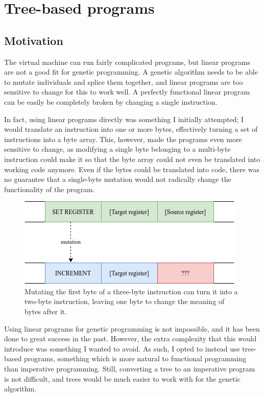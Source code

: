 \documentclass{report}
\begin{document}
\section{Tree-based programs}
\subsection{Motivation}
The virtual machine can run fairly complicated programs, but linear programs are not a good fit for genetic programming. A genetic algorithm needs to be able to mutate individuals and splice them together, and linear programs are too sensitive to change for this to work well. A perfectly functional linear program can be easily be completely broken by changing a single instruction.

In fact, using linear programs directly was something I initially attempted; I would translate an instruction into one or more bytes, effectively turning a set of instructions into a byte array. This, however, made the programs even more sensitive to change, as modifying a single byte belonging to a multi-byte instruction could make it so that the byte array could not even be translated into working code anymore. Even if the bytes could be translated into code, there was no guarantee that a single-byte mutation would not radically change the functionality of the program.

\begin{figure}[ht]
    \centering
    \includegraphics[scale=0.75]{binary_mutation}
    \caption{Mutating the first byte of a three-byte instruction can turn it into a two-byte instruction, leaving one byte to change the meaning of bytes after it.}
\end{figure}

Using linear programs for genetic programming is not impossible, and it has been done to great success in the past. However, the extra complexity that this would introduce was something I wanted to avoid. As such, I opted to instead use tree-based programs, something which is more natural to functional programming than imperative programming. Still, converting a tree to an imperative program is not difficult, and trees would be much easier to work with for the genetic algorithm.
\end{document}

